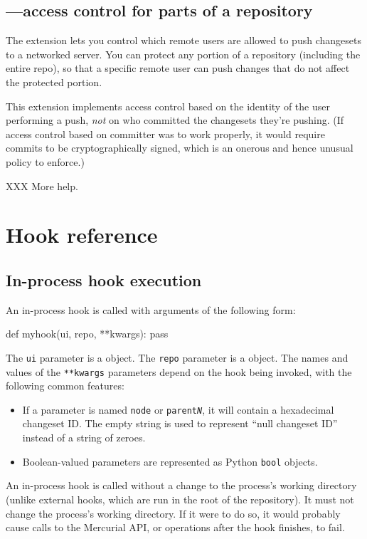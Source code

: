 \subsection{---access control for parts of a repository}

The  extension lets you control which remote users are
allowed to push changesets to a networked server.  You can protect any
portion of a repository (including the entire repo), so that a
specific remote user can push changes that do not affect the protected
portion.

This extension implements access control based on the identity of the
user performing a push, \emph{not} on who committed the changesets
they're pushing.  (If access control based on committer was to work
properly, it would require commits to be cryptographically signed,
which is an onerous and hence unusual policy to enforce.)

XXX More help.

\section{Hook reference}
\label{sec:hook:ref}

\subsection{In-process hook execution}

An in-process hook is called with arguments of the following form:
\begin{codesample2}
  def myhook(ui, repo, **kwargs):
      pass
\end{codesample2}
The \texttt{ui} parameter is a  object.
The \texttt{repo} parameter is a
 object.  The
names and values of the \texttt{**kwargs} parameters depend on the
hook being invoked, with the following common features:
\begin{itemize}
\item If a parameter is named \texttt{node} or
  \texttt{parent\emph{N}}, it will contain a hexadecimal changeset ID.
  The empty string is used to represent ``null changeset ID'' instead
  of a string of zeroes.
\item Boolean-valued parameters are represented as Python
  \texttt{bool} objects.
\end{itemize}

An in-process hook is called without a change to the process's working
directory (unlike external hooks, which are run in the root of the
repository).  It must not change the process's working directory.  If
it were to do so, it would probably cause calls to the Mercurial API,
or operations after the hook finishes, to fail.

